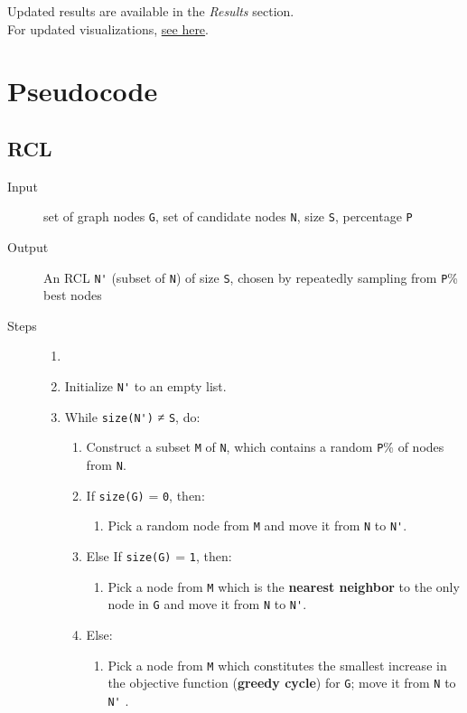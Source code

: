 \documentclass[14pt]{article}
\begin{document}
\vspace{4mm}
\noindent
Updated results are available in the \emph{Results} section. \\
For updated visualizations,
\href{https://github.com/RoyalDonkey/put-ec-tasks/tree/239c25653774b4275a0a73c46154d6b743279b0d/task1/results}{see here}.


\section{Pseudocode}
\subsection{RCL}
\begin{description}
	\item [Input] set of graph nodes \verb`G`, set of candidate nodes \verb`N`,
		size \verb`S`, percentage \verb`P`
	\item [Output] An RCL \verb`N'` (subset of \verb`N`) of size \verb`S`,
		chosen by repeatedly sampling from \verb`P`\% best nodes
	\item [Steps]
		\begin{enumerate}\item []
			\item Initialize \verb`N'` to an empty list.
			\item While \verb`size(N')` ≠ \verb`S`, do:
				\begin{enumerate}
					\item Construct a subset \verb`M` of \verb`N`, which
						contains a random \verb`P`\% of nodes from \verb`N`.
					\item If \verb`size(G)` = \verb`0`, then:
						\begin{enumerate}
							\item Pick a random node from \verb`M` and move it
								from \verb`N` to \verb`N'`.
						\end{enumerate}
					\item Else If \verb`size(G)` = \verb`1`, then:
						\begin{enumerate}
							\item Pick a node from \verb`M` which is the
								\textbf{nearest neighbor} to the only node in \verb`G`
								and move it from \verb`N` to \verb`N'`.
						\end{enumerate}
					\item Else:
						\begin{enumerate}
							\item Pick a node from \verb`M` which constitutes
								the smallest increase in the objective function
								(\textbf{greedy cycle}) for \verb`G`; move it
								from \verb`N` to \verb`N'` .
						\end{enumerate}
				\end{enumerate}
		\end{enumerate}
\end{description}
\end{document}
